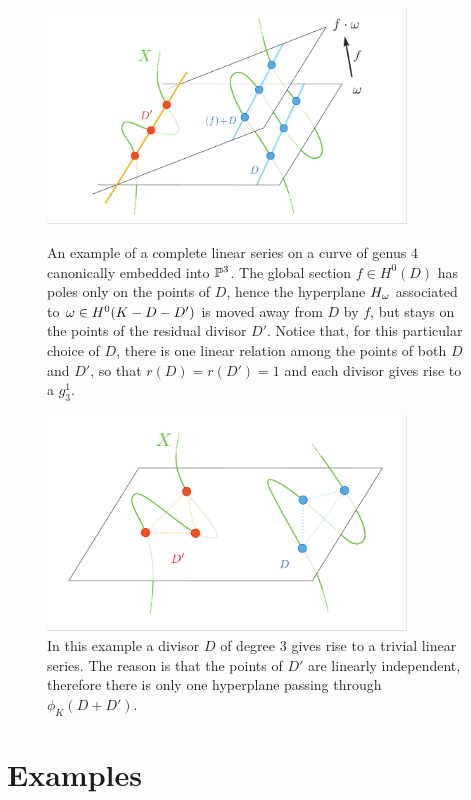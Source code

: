 	\begin{figure}[H]
		\centering
		\includegraphics[width=0.85\textwidth]{Example.pdf}
		\caption{An example of a complete linear series on a curve of genus $4$ canonically embedded into $\mathbb{P}^3$. The global section $f\in H^0(D)$ has poles only on the points of $D$, hence the hyperplane $H_{\omega}$ associated to $\omega \in H^0(K-D-D')$ is moved away from $D$ by $f$, but stays on the points of the residual divisor $D'$. Notice that, for this particular choice of $D$, there is one linear relation among the points of both $D$ and $D'$, so that $r(D)=r(D')=1$ and each divisor gives rise to a $g_3^1$. }
		\label{fig:Example}
		
		\vspace{4em}

		\centering
		\includegraphics[width=0.85\textwidth]{Example2.pdf}
		\caption{In this example a divisor $D$ of degree $3$ gives rise to a trivial linear series. The reason is that the points of $D'$ are linearly independent, therefore there is only one hyperplane passing through $\phi_K(D+D')$. }
		\label{fig:Example2}
	\end{figure}


\section{Examples}\label{sec:examples}
	
